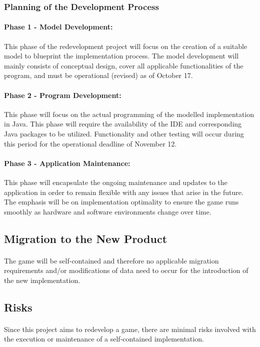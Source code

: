 \documentclass[12pt, titlepage]{article}
\begin{document}
\subsubsection{Planning of the Development Process}
\paragraph{Phase 1 - Model Development:}
This phase of the redevelopment project will focus on the creation of a suitable model to blueprint the implementation process. The model development will mainly consists of conceptual design, cover all applicable functionalities of the program, and must be operational (revised) as of October 17.
\paragraph{Phase 2 - Program Development:}
This phase will focus on the actual programming of the modelled implementation in Java. This phase will require the availability of the IDE and corresponding Java packages to be utilized. Functionality and other testing will occur during this period for the operational deadline of November 12.
\paragraph{Phase 3 - Application Maintenance:}
This phase will encapsulate the ongoing maintenance and updates to the application in order to remain flexible with any issues that arise in the future. The emphasis will be on implementation optimality to ensure the game runs smoothly as hardware and software environments change over time.

\subsection{Migration to the New Product}
\paragraph{}
The game will be self-contained and therefore no applicable migration requirements and/or modifications of data need to occur for the introduction of the new implementation.

\subsection{Risks}
\paragraph{}
Since this project aims to redevelop a game, there are minimal risks involved with the execution or maintenance of a self-contained implementation.
\end{document}
